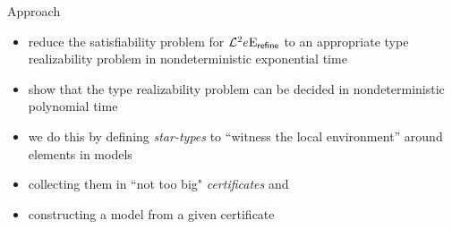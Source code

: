 \documentclass{beamer}
\begin{document}
\begin{frame}{Approach}
\begin{itemize}
  \item reduce the satisfiability problem for $\mathcal{L}^{2}_{{}}{e}\mathrm{E}_{\mathsf{refine}}$
  to an appropriate type realizability problem in nondeterministic exponential
  time
  \item show that the type realizability problem can be decided in
  nondeterministic polynomial time
  \item we do this by defining \emph{star-types} to ``witness the local
  environment'' around elements in models
  \item collecting them in ``not too big" \emph{certificates} and
  \item constructing a model from a given certificate
\end{itemize}
\end{frame}
\end{document}
